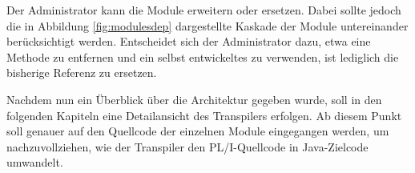 Der Administrator kann die Module erweitern oder ersetzen. Dabei sollte jedoch die in Abbildung \ref{fig:modulesdep} dargestellte Kaskade der Module untereinander berücksichtigt werden. Entscheidet sich der Administrator dazu, etwa eine Methode zu entfernen und ein selbst entwickeltes zu verwenden, ist lediglich die bisherige Referenz zu ersetzen.

Nachdem nun ein Überblick über die Architektur gegeben wurde, soll in den folgenden Kapiteln eine Detailansicht des Transpilers erfolgen. Ab diesem Punkt soll genauer auf den Quellcode der einzelnen Module eingegangen werden, um nachzuvollziehen, wie der Transpiler den PL/I-Quellcode in Java-Zielcode umwandelt.





